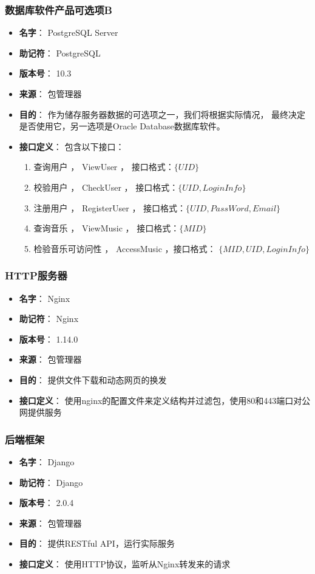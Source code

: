 \subsubsection{数据库软件产品可选项B} %
\begin{itemize}
	\item \textbf{名字}：
		PostgreSQL Server
	\item \textbf{助记符}：
		PostgreSQL
	\item \textbf{版本号}：
		10.3
	\item \textbf{来源}：
		包管理器
	\item \textbf{目的}：
		作为储存服务器数据的可选项之一，我们将根据实际情况，
			最终决定是否使用它，另一选项是Oracle Database数据库软件。
	\item \textbf{接口定义}：
		包含以下接口：
		\begin{enumerate}
			\item 查询用户 ， ViewUser   ， 接口格式：$\{ UID \}$
			\item 校验用户 ， CheckUser  ， 接口格式：$\{ UID, LoginInfo \}$
			\item 注册用户 ， RegisterUser  ， 接口格式：$\{ UID,  PassWord, Email\}$
			\item 查询音乐 ， ViewMusic  ， 接口格式：$\{ MID \}$
			\item 检验音乐可访问性 ， AccessMusic ，接口格式： $\{ MID, UID, LoginInfo \}$ 
		\end{enumerate}
\end{itemize}

\subsubsection{HTTP服务器} %
\begin{itemize}
	\item \textbf{名字}：
	Nginx
	\item \textbf{助记符}：
	Nginx
	\item \textbf{版本号}：
	1.14.0
	\item \textbf{来源}：
	包管理器
	\item \textbf{目的}：
	提供文件下载和动态网页的换发
	\item \textbf{接口定义}：
	使用nginx的配置文件来定义结构并过滤包，使用80和443端口对公网提供服务
\end{itemize}

\subsubsection{后端框架} %
\begin{itemize}
	\item \textbf{名字}：
	Django
	\item \textbf{助记符}：
	Django
	\item \textbf{版本号}：
	2.0.4
	\item \textbf{来源}：
	包管理器
	\item \textbf{目的}：
	提供RESTful API，运行实际服务
	\item \textbf{接口定义}：
	使用HTTP协议，监听从Nginx转发来的请求
\end{itemize}

